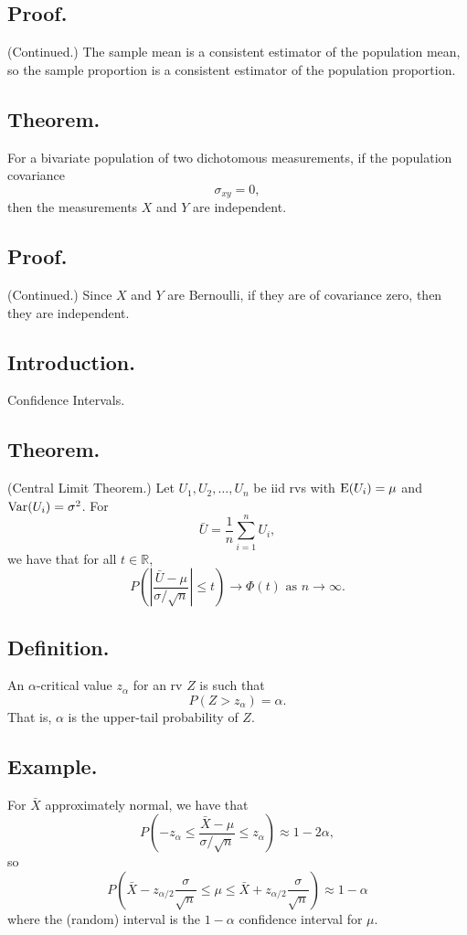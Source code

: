 \documentclass[titlepage]{article}
\begin{document}
\subsection{Proof.} (Continued.) The sample mean is a consistent estimator of the population mean, so the sample proportion is a consistent estimator of the population proportion.

\subsection{Theorem.} For a bivariate population of two dichotomous measurements, if the population covariance 
$$\sigma_{xy} = 0,$$
then the measurements $X$ and $Y$ are independent.

\subsection{Proof.} (Continued.) Since $X$ and $Y$ are Bernoulli, if they are of covariance zero, then they are independent.

\newpage {}

\subsection{Introduction.} Confidence Intervals.

\subsection{Theorem.} (Central Limit Theorem.) Let $U_{1}, U_{2}, \ldots, U_{n}$ be iid rvs with $\text{E}(U_{i}) = \mu$ and $\text{Var}(U_{i}) = \sigma^{2}$. For $$\bar{U} = \frac{1}{n}\sum_{i=1}^{n}U_{i},$$
we have that for all $t \in \mathbb{R}$,
$$P\left(\left|\frac{\bar{U} - \mu}{\sigma/\sqrt{n}}\right| \leq t\right) \rightarrow \Phi(t) \text{ as } n \rightarrow \infty.$$

\subsection{Definition.} An $\alpha$-critical value $z_{\alpha}$ for an rv $Z$ is such that 
$$P(Z > z_{\alpha}) = \alpha.$$
That is, $\alpha$ is the upper-tail probability of $Z$.

\subsection{Example.} For $\bar{X}$ approximately normal, we have that 
$$P\left(-z_{\alpha} \leq \frac{\bar{X} - \mu}{\sigma/\sqrt{n}} \leq z_{\alpha}\right) \approx 1 - 2\alpha,$$
so
$$P\left(\bar{X} - z_{\alpha/2}\frac{\sigma}{\sqrt{n}} \leq \mu \leq \bar{X} + z_{\alpha/2}\frac{\sigma}{\sqrt{n}}\right) \approx 1 - \alpha$$
where the (random) interval is the $1-\alpha$ confidence interval for $\mu$.
\end{document}
